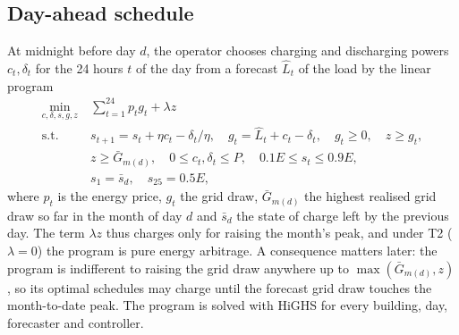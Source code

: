 \subsection{Day-ahead schedule}
At midnight before day $d$, the operator chooses charging and discharging powers $c_t,\delta_t$ for the 24 hours $t$ of the day from a forecast $\hat L_t$ of the load by the linear program
\begin{align}
\min_{c,\delta,s,g,z}\ & \sum_{t=1}^{24} p_t g_t + \lambda z \label{eq:lp}\\
\text{s.t.}\ & s_{t+1}=s_t+\eta c_t-\delta_t/\eta,\quad g_t=\hat L_t+c_t-\delta_t,\quad g_t\ge 0,\quad z\ge g_t, \nonumber\\
& z\ge \bar G_{m(d)},\quad 0\le c_t,\delta_t\le P,\quad 0.1E\le s_t\le 0.9E, \nonumber\\
& s_1=\bar s_d,\quad s_{25}=0.5E, \nonumber
\end{align}
where $p_t$ is the energy price, $g_t$ the grid draw, $\bar G_{m(d)}$ the highest realised grid draw so far in the month of day $d$ and $\bar s_d$ the state of charge left by the previous day. The term $\lambda z$ thus charges only for raising the month's peak, and under T2 ($\lambda=0$) the program is pure energy arbitrage. A consequence matters later: the program is indifferent to raising the grid draw anywhere up to $\max(\bar G_{m(d)},z)$, so its optimal schedules may charge until the forecast grid draw touches the month-to-date peak. The program is solved with HiGHS for every building, day, forecaster and controller.

